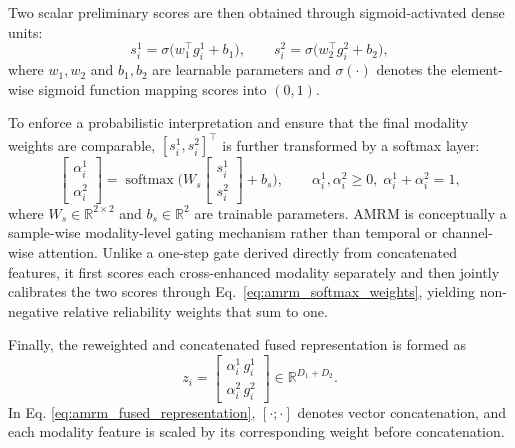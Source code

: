 \documentclass[a4paper]{cas-sc}
\begin{document}
Two scalar preliminary scores are then obtained through sigmoid-activated dense units:
\begin{equation}
    s_i^{1} = \sigma \big( w_1^{\top} g_i^{1} + b_1 \big), \qquad
    s_i^{2} = \sigma \big( w_2^{\top} g_i^{2} + b_2 \big),
    \label{eq:amrm_sigmoid_scores}
\end{equation}
where $w_1, w_2$ and $b_1, b_2$ are learnable parameters and $\sigma(\cdot)$ denotes the element-wise sigmoid function mapping scores into $(0,1)$.

To enforce a probabilistic interpretation and ensure that the final modality weights are comparable, $[s_i^{1}, s_i^{2}]^\top$ is further transformed by a softmax layer:
\begin{equation}
    \begin{bmatrix}
        \alpha_i^{1} \\
        \alpha_i^{2}
    \end{bmatrix}
    =
    \operatorname{softmax}
    \Big(
        W_s
        \begin{bmatrix}
            s_i^{1} \\
            s_i^{2}
        \end{bmatrix}
        + b_s
    \Big),
    \qquad
    \alpha_i^{1}, \alpha_i^{2} \ge 0,\;
    \alpha_i^{1} + \alpha_i^{2} = 1,
    \label{eq:amrm_softmax_weights}
\end{equation}
where $W_s \in \mathbb{R}^{2 \times 2}$ and $b_s \in \mathbb{R}^{2}$ are trainable parameters. AMRM is conceptually a sample-wise modality-level gating mechanism rather than temporal or channel-wise attention. Unlike a one-step gate derived directly from concatenated features, it first scores each cross-enhanced modality separately and then jointly calibrates the two scores through Eq.~\ref{eq:amrm_softmax_weights}, yielding non-negative relative reliability weights that sum to one.

Finally, the reweighted and concatenated fused representation is formed as
\begin{equation}
    z_i
    =
    \begin{bmatrix}
        \alpha_i^{1} \, g_i^{1} \\
        \alpha_i^{2} \, g_i^{2}
    \end{bmatrix}
    \in \mathbb{R}^{D_1 + D_2}.
    \label{eq:amrm_fused_representation}
\end{equation}
In Eq. \eqref{eq:amrm_fused_representation}, $[\cdot;\cdot]$ denotes vector concatenation,
and each modality feature is scaled by its corresponding weight before concatenation.
\end{document}
